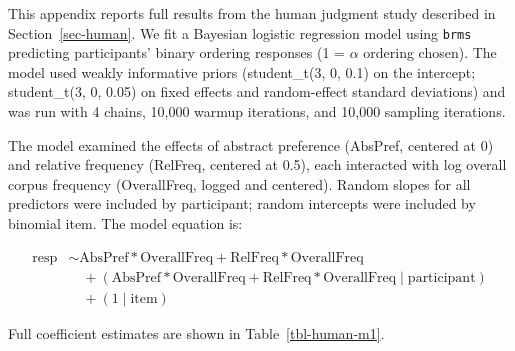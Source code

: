 \documentclass{article}
\begin{document}
This appendix reports full results from the human judgment study
described in Section~\ref{sec-human}. We fit a Bayesian logistic
regression model using \texttt{brms} \citep{R-brms} predicting
participants' binary ordering responses (1 = \(\alpha\) ordering
chosen). The model used weakly informative priors (student\_t(3, 0, 0.1)
on the intercept; student\_t(3, 0, 0.05) on fixed effects and
random-effect standard deviations) and was run with 4 chains, 10,000
warmup iterations, and 10,000 sampling iterations.

The model examined the effects of abstract preference (AbsPref, centered
at 0) and relative frequency (RelFreq, centered at 0.5), each interacted
with log overall corpus frequency (OverallFreq, logged and centered).
Random slopes for all predictors were included by participant; random
intercepts were included by binomial item. The model equation is:

\[
\begin{aligned}
\text{resp} &\sim \text{AbsPref} * \text{OverallFreq} + \text{RelFreq} * \text{OverallFreq} \\
            &\quad + (\text{AbsPref} * \text{OverallFreq} + \text{RelFreq} * \text{OverallFreq} \mid \text{participant}) \\
            &\quad + (1 \mid \text{item})
\end{aligned}
\]

Full coefficient estimates are shown in Table~\ref{tbl-human-m1}.

\begin{table}[H]


\caption{\label{tbl-human-m1}Coefficient estimates for the analysis of
human 2AFC preferences. AbsPref = abstract preference (centered);
RelFreq = relative frequency (centered); OverallFreq = corpus frequency,
logged and centered.}

\end{table}%
\end{document}
